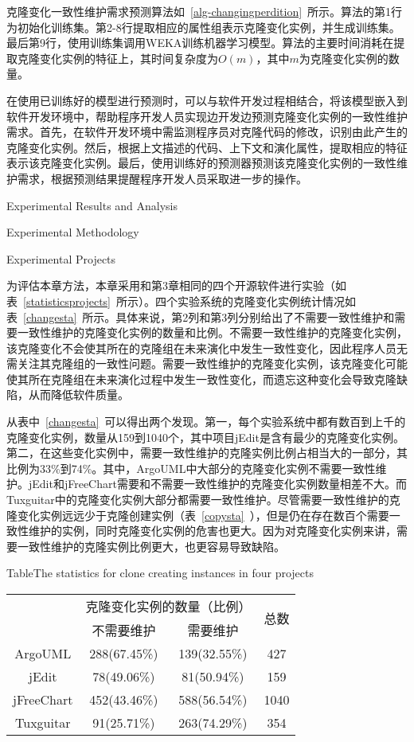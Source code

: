 克隆变化一致性维护需求预测算法如~\ref{alg-changingperdition}~所示。算法的第1行为初始化训练集。第2-8行提取相应的属性组表示克隆变化实例，并生成训练集。最后第9行，使用训练集调用WEKA训练机器学习模型。算法的主要时间消耗在提取克隆变化实例的特征上，其时间复杂度为$O(m)$，其中$m$为克隆变化实例的数量。

在使用已训练好的模型进行预测时，可以与软件开发过程相结合，将该模型嵌入到软件开发环境中，帮助程序开发人员实现边开发边预测克隆变化实例的一致性维护需求。首先，在软件开发环境中需监测程序员对克隆代码的修改，识别由此产生的克隆变化实例。然后，根据上文描述的代码、上下文和演化属性，提取相应的特征表示该克隆变化实例。最后，使用训练好的预测器预测该克隆变化实例的一致性维护需求，根据预测结果提醒程序开发人员采取进一步的操作。

{Experimental Results and Analysis}

{Experimental Methodology}

{Experimental Projects}

为评估本章方法，本章采用和第3章相同的四个开源软件进行实验（如表~\ref{statisticsprojects}~所示）。四个实验系统的克隆变化实例统计情况如表~\ref{changesta}~所示。具体来说，第2列和第3列分别给出了不需要一致性维护和需要一致性维护的克隆变化实例的数量和比例。不需要一致性维护的克隆变化实例，该克隆变化不会使其所在的克隆组在未来演化中发生一致性变化，因此程序人员无需关注其克隆组的一致性问题。需要一致性维护的克隆变化实例，该克隆变化可能使其所在克隆组在未来演化过程中发生一致性变化，而遗忘这种变化会导致克隆缺陷，从而降低软件质量。

从表中~\ref{changesta}~可以得出两个发现。第一，每个实验系统中都有数百到上千的克隆变化实例，数量从159到1040个，其中项目{jEdit}是含有最少的克隆变化实例。第二，在这些变化实例中，需要一致性维护的克隆实例比例占相当大的一部分，其比例为33\%到74\%。其中，ArgoUML中大部分的克隆变化实例不需要一致性维护。jEdit和jFreeChart需要和不需要一致性维护的克隆变化实例数量相差不大。而Tuxguitar中的克隆变化实例大部分都需要一致性维护。尽管需要一致性维护的克隆变化实例远远少于克隆创建实例（表~\ref{copysta}~），但是仍在存在数百个需要一致性维护的实例，同时克隆变化实例的危害也更大。因为对克隆变化实例来讲，需要一致性维护的克隆实例比例更大，也更容易导致缺陷。

\begin{table}[htbp]
{Table$\!$}{The statistics for clone creating instances in four projects}
\vspace{0.5em}
\centering
\wuhao
\begin{tabular}{cccc}
\toprule[1.5pt]
~\multirow{2}{*}{实验系统}& \multicolumn{2}{c}{克隆变化实例的数量（比例）} & \multirow{2}{*}{总数}\\ 
 \cline{2-3}
~&{不需要维护} &{需要维护} & ~\\
\midrule[1pt]
ArgoUML&288(67.45\%)&139(32.55\%)&427\\
jEdit&78(49.06\%)&81(50.94\%)&159\\
jFreeChart&452(43.46\%)&588(56.54\%)&1040\\
Tuxguitar&91(25.71\%)&263(74.29\%)&354\\
\bottomrule[1.5pt]
\end{tabular}
\end{table}

